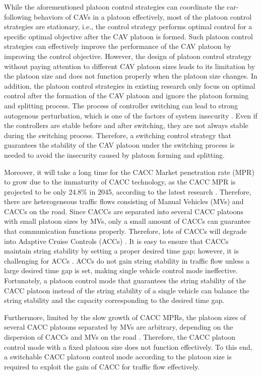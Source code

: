 \documentclass[trsc,nonblindrev]{informs3} %
\begin{document}
While the aforementioned platoon control strategies can coordinate the car-following behaviors of CAVs in a platoon effectively, most of the platoon control strategies are stationary, i.e., the control strategy performs optimal control for a specific optimal objective after the CAV platoon is formed. Such platoon control strategies can effectively improve the performance of the CAV platoon by improving the control objective. However, the design of platoon control strategy without paying attention to different CAV platoon sizes leads to its limitation by the platoon size and does not function properly when the platoon size changes. In addition, the platoon control strategies in existing research only focus on optimal control after the formation of the CAV platoon and ignore the platoon forming and splitting process. The process of controller switching can lead to strong autogenous perturbation, which is one of the factors of system insecurity \citep{Stefanovic2008}. Even if the controllers are stable before and after switching, they are not always stable during the switching process. Therefore, a switching control strategy that guarantees the stability of the CAV platoon under the switching process is needed to avoid the insecurity caused by platoon forming and splitting.


Moreover, it will take a long time for the CACC Market penetration rate (MPR) to grow due to the immaturity of CACC technology, as the CACC MPR is projected to be only 24.8\% in 2045, according to the latest research \citep{Bansal2017}. Therefore, there are heterogeneous traffic flows consisting of Manual Vehicles (MVs) and CACCs on the road. Since CACCs are separated into several CACC platoons with small platoon sizes by MVs, only a small amount of CACCs can guarantee that communication functions properly. Therefore, lots of CACCs will degrade into Adaptive Cruise Controls (ACCs) \citep{ruanImpactsInformationFlow2022,Yao2021}. It is easy to ensure that CACCs maintain string stability by setting a proper desired time gap; however, it is challenging for ACCs \citep{Montanino2021a,Shang2021,marsden2001towards}. ACCs do not gain string stability in traffic flow unless a large desired time gap is set, making single vehicle control mode ineffective. Fortunately, a platoon control mode that guarantees the string stability of the CACC platoon instead of the string stability of a single vehicle can balance the string stability and the capacity corresponding to the desired time gap.

Furthermore, limited by the slow growth of CACC MPRs, the platoon sizes of several CACC platoons separated by MVs are arbitrary, depending on the dispersion of CACCs and MVs on the road \citep{zhou2020stabilizing}. Therefore, the CACC platoon control mode with a fixed platoon size does not function effectively. To this end, a switchable CACC platoon control mode according to the platoon size is required to exploit the gain of CACC for traffic flow effectively.
\end{document}
